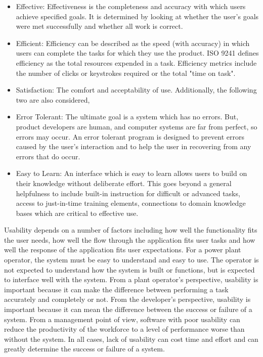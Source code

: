 \begin{itemize}

\item Effective: Effectiveness is the completeness and accuracy with which users achieve specified goals. It is determined by looking at whether the user's goals were met successfully and whether all work is correct.

\item Efficient: Efficiency can be described as the speed (with accuracy) in which users can complete the tasks for which they use the product. ISO 9241 defines efficiency as the total resources expended in a task. Efficiency metrics include the number of clicks or keystrokes required or the total "time on task".

\item Satisfaction: The comfort and acceptability of use. Additionally, the following two are also considered,

\item Error Tolerant: The ultimate goal is a system which has no errors. But, product developers are human, and computer systems are far from perfect, so errors may occur. An error tolerant program is designed to prevent errors caused by the user's interaction and to help the user in recovering from any errors that do occur.

\item Easy to Learn: An interface which is easy to learn allows users to build on their knowledge without deliberate effort. This goes beyond a general helpfulness to include built-in instruction for difficult or advanced tasks, access to just-in-time training elements, connections to domain knowledge bases which are critical to effective use.

\end{itemize}

Usability depends on a number of factors including how well the functionality fits the user needs, how well the flow through the application fits user tasks and how well the response of the application fits user expectations. For a power plant operator, the system must be easy to understand and easy to use. The operator is not expected to understand how the system is built or functions, but is expected to interface well with the system. 
\newline
From a plant operator's perspective, usability is important because it can make the difference between performing a task accurately and completely or not. From the developer's perspective, usability is important because it can mean the difference between the success or failure of a system. From a management point of view, software with poor usability can reduce the productivity of the workforce to a level of performance worse than without the system. In all cases, lack of usability can cost time and effort and can greatly determine the success or failure of a system. 

